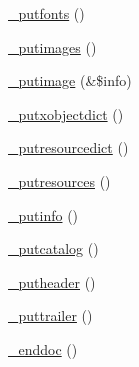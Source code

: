 \begin{DoxyCompactItemize}
\hyperlink{class_f_p_d_f_a283308a9c41ca18f57649d60f312d7d1}{\-\_\-putfonts} ()
\item 
\hyperlink{class_f_p_d_f_ab1f143c4ef408cb6287fa60b8dbdd8c4}{\-\_\-putimages} ()
\item 
\hyperlink{class_f_p_d_f_ac00fdb8b339c9b9ef3556515979bc7b7}{\-\_\-putimage} (\&\$info)
\item 
\hyperlink{class_f_p_d_f_a61df2cca07c80226d3b671b8ac208214}{\-\_\-putxobjectdict} ()
\item 
\hyperlink{class_f_p_d_f_a7681576bf6a875238ecdabd5fb4f36b8}{\-\_\-putresourcedict} ()
\item 
\hyperlink{class_f_p_d_f_a2fb9db0c32c794a2535eb445b7fcaaca}{\-\_\-putresources} ()
\item 
\hyperlink{class_f_p_d_f_adeada505b347aa76ae6f1522b4219fe0}{\-\_\-putinfo} ()
\item 
\hyperlink{class_f_p_d_f_af31a901fbed24337636bd85634042060}{\-\_\-putcatalog} ()
\item 
\hyperlink{class_f_p_d_f_a132522bbceb722a3181fc216f93bd9a9}{\-\_\-putheader} ()
\item 
\hyperlink{class_f_p_d_f_a977c65c92c43a052d2ec4b1e80a2a7dd}{\-\_\-puttrailer} ()
\item 
\hyperlink{class_f_p_d_f_a5872b1a94bcd6c00a0bdd2ece02409ac}{\-\_\-enddoc} ()
\end{DoxyCompactItemize}
